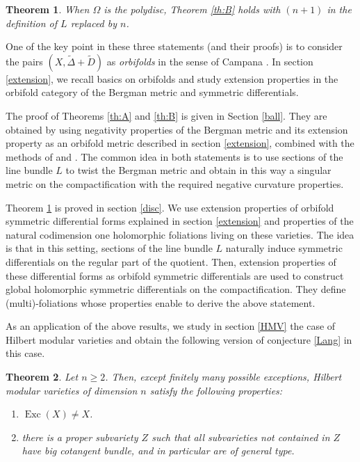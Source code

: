 \documentclass[JEP,XML,SOM,Unicode]{cedram}
\theoremstyle{plain}
\newtheorem{thma}{Theorem}
\theoremstyle{definition}
\numberwithin{equation}{theorem}
\newenvironment{enumerateth}
{\bgroup\def\theenumi{\thetheorem.\arabic{enumi}}
\begin{enumerate}
\setcounter{enumi}{\value{equation}}}
{\setcounter{equation}{\value{enumi}}
\end{enumerate}
\egroup}
\DeclareMathOperator{\Exc}{Exc}
\begin{document}
\begin{thma}\label{th:C} When $\Omega$ is the polydisc, Theorem \ref{th:B} holds with $(n+1)$ in the definition of $L$ replaced
by $n$.
\end{thma}

One of the key point in these three statements (and their proofs) is to consider the pairs $(X, \widetilde{\Delta}+\widetilde{D})$ as \emph{orbifolds} in the sense of Campana \cite{Cam04}. In section \ref{extension}, we recall basics on orbifolds and study extension properties in the orbifold category of the Bergman metric and symmetric differentials.

The proof of Theorems \ref{th:A} and \ref{th:B} is given in Section \ref{ball}. They are obtained by using negativity properties of the Bergman metric and its extension property as an orbifold metric described in section \ref{extension}, combined with the methods of \cite{cad16} and \cite{G18}. The common idea in both statements is to use sections of the line bundle $L$ to twist the Bergman metric and obtain in this way a singular metric on the compactification with the required negative curvature properties.

Theorem \ref{th:C} is proved in section \ref{disc}. We use extension properties of orbifold symmetric differential forms explained in section \ref{extension} and properties of the natural codimension one holomorphic foliations living on these varieties. The idea is that in this setting, sections of the line bundle $L$ naturally induce symmetric differentials on the regular part of the quotient. Then, extension properties of these differential forms as orbifold symmetric differentials are used to construct global holomorphic symmetric differentials on the compactification. They define (multi)-foliations whose properties enable to derive the above statement.

As an application of the above results, we study in section \ref{HMV} the case of Hilbert modular varieties and obtain the following version of conjecture \ref{Lang} in this case.

\begin{thma}\label{th:D}
Let $n \geq 2$. Then, except finitely many possible exceptions, Hilbert modular varieties of dimension $n$ satisfy the following properties:
\begin{enumerateth}
\item $\Exc(X) \neq X$.
\item there is a proper subvariety $Z$ such that all subvarieties not contained in $Z$ have big cotangent bundle, and in particular are of general type.
\end{enumerateth}
\end{thma}
\end{document}
